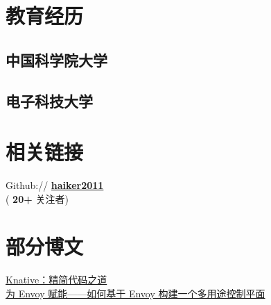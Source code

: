\documentclass[]{deedy-resume-openfont}
\begin{document}
%
%
\lastupdated

%
%

%
%

\begin{minipage}[t]{0.3\textwidth} 


\section{教育经历} 
\sectionsep

\subsection{中国科学院大学}
\sectionsep

\subsection{电子科技大学}
\sectionsep


\section{相关链接}
\sectionsep    
Github:// \href{https://github.com/haiker2011}{\bf haiker2011} \\
{(\textbf{ 20+ }关注者)} \\

\section{部分博文}
\sectionsep
\href{http://www.servicemesher.com/blog/knative-whittling-down-the-code/}{Knative：精简代码之道} \\
\href{http://www.servicemesher.com/blog/building-a-control-plane-for-envoy/}{为 Envoy 赋能——如何基于 Envoy 构建一个多用途控制平面} \\



\end{minipage}
\end{document}

